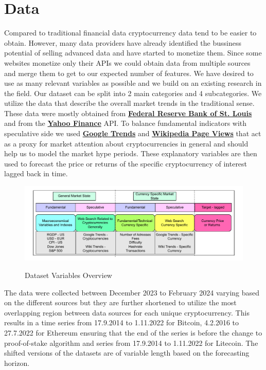 \chapter{Data}
\label{chap:three}

Compared to traditional financial data cryptocurrency data tend to be easier
to obtain. However, many data providers have already identified the bussiness 
potential of selling advanced data and have started to monetize them. Since some
websites monetize only their APIs we could obtain data from 
multiple sources and merge them to get to our expected number of features. We have
desired to use as many relevant variables as possible and we build on
an existing research in the field.
Our dataset can be split into 2 main categories and 4 subcategories.
We utilize the data that describe the overall market trends in the traditional
sense. These data were mostly obtained from \textbf{\href{https://fred.stlouisfed.org/}{Federal Reserve Bank of St. Louis}}
and from the 
\textbf{\href{https://finance.yahoo.com/markets/}{Yahoo Finance}} API.
To balance fundamental indicators with speculative side we used \textbf{\href{https://trends.google.com/trends/}{Google Trends}}
and \textbf{\href{https://pageviews.wmcloud.org/}{Wikipedia Page Views}} 
that act as a proxy for market attention about cryptocurrencies in general 
and should help us to model the market hype periods. These explanatory
variables are then used to forecast the price or returns of the specific cryptocurrency
of interest lagged back in time.

\begin{figure}[!h]
    \centering
    \caption{Dataset Variables Overview}
        \includegraphics[width=1\textwidth]{Figures/dataset_description.drawio.pdf}
    \label{fig:dataset_description}
\end{figure}


The data were collected between December 2023 to February 2024 varying 
based on
the different sources but they are further shortened to utilize the most
overlapping region between data sources for each unique cryptocurrency.
This results in a time series from 17.9.2014 to 1.11.2022 for Bitcoin, 4.2.2016
to 27.7.2022 for Ethereum ensuring that the end of the series is 
before the change to proof-of-stake algorithm and series from 17.9.2014 to 1.11.2022
for Litecoin. The shifted versions of the datasets are of variable length based
on the forecasting horizon. 
